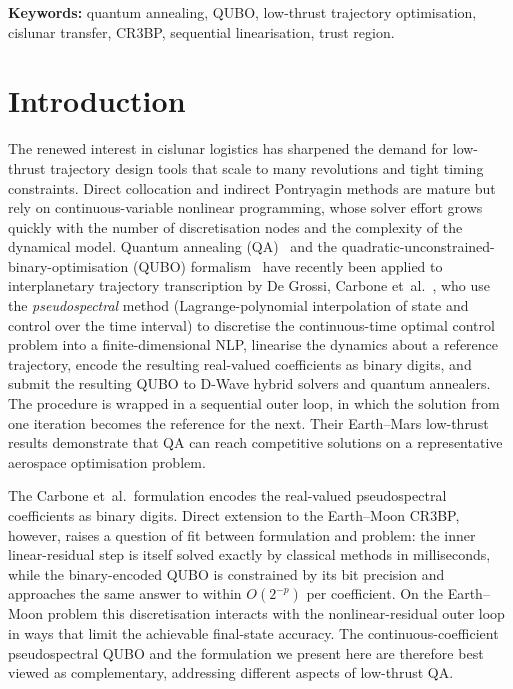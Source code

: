 \documentclass[11pt,a4paper]{article}
\theoremstyle{plain}
\begin{document}
\noindent\textbf{Keywords:} quantum annealing, QUBO, low-thrust trajectory optimisation, cislunar transfer, CR3BP, sequential linearisation, trust region.

\section{Introduction}\label{sec:introduction}

The renewed interest in cislunar logistics has sharpened the demand for low-thrust trajectory design tools
that scale to many revolutions and tight timing constraints. Direct
collocation and indirect Pontryagin methods are mature but rely on
continuous-variable nonlinear programming, whose solver effort grows
quickly with the number of discretisation nodes and the complexity
of the dynamical model. Quantum annealing (QA)~\cite{Albash2018} and the quadratic-unconstrained-binary-optimisation (QUBO)
formalism~\cite{Glover2019} have recently been applied to interplanetary trajectory transcription by
De Grossi, Carbone et~al.~\cite{Carbone2025}, who use the
\emph{pseudospectral} method (Lagrange-polynomial interpolation of
state and control over the time interval) to discretise the
continuous-time optimal control problem into a finite-dimensional
NLP, linearise the dynamics about a reference trajectory, encode
the resulting real-valued coefficients as binary digits, and submit
the resulting QUBO to D-Wave hybrid solvers and quantum annealers.
The procedure is wrapped in a sequential outer loop, in which the
solution from one iteration becomes the reference for the next.
Their Earth--Mars low-thrust results demonstrate that QA can reach
competitive solutions on a representative aerospace optimisation
problem.

The Carbone et~al.\ formulation encodes the real-valued
pseudospectral coefficients as binary digits. Direct extension to the Earth--Moon
CR3BP, however, raises a question of fit between formulation and
problem: the inner linear-residual step is itself solved exactly by
classical methods in milliseconds, while the binary-encoded QUBO
is constrained by its bit precision and approaches the same answer
to within $O(2^{-p})$ per coefficient. On the Earth--Moon problem
this discretisation interacts with the nonlinear-residual outer
loop in ways that limit the achievable final-state accuracy. The
continuous-coefficient pseudospectral QUBO and the formulation we
present here are therefore best viewed as complementary, addressing
different aspects of low-thrust QA.
\end{document}
